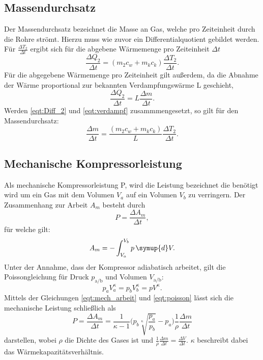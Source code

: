   \subsection{Massendurchsatz}
    Der Massendurchsatz bezeichnet die Masse an Gas, welche pro Zeiteinheit durch die Rohre strömt.
    Hierzu muss wie zuvor ein Differentialquotient gebildet werden. Für $\frac {\Delta T_2}{\Delta t}$ ergibt sich für die abgebene Wärmemenge pro Zeiteinheit $\Delta t$
    \begin{equation}
      \label{eqt:Diff_2}
      \frac {\Delta Q_2} {\Delta t} = (m_2 c_w + m_k c_k) \frac {\Delta T_2} {\Delta t}.
    \end{equation}
    Für die abgegebene Wärmemenge pro Zeiteinheit gilt außerdem, da die Abnahme der Wärme proportional zur bekannten Verdampfungswärme L geschieht, 
    \begin{equation}
      \label{eqt:verdampf}
      \frac {\Delta Q_2}{\Delta t} = L \frac {\Delta m} {\Delta t} .
    \end{equation}
    Werden \eqref {eqt:Diff_2} und \eqref {eqt:verdampf} zusammmengesetzt, so gilt für den Massendurchsatz:
    \begin{equation}
      \label{eqt:massendurchsatz}
      \frac {\Delta m} {\Delta t} = \frac {(m_2 c_w + m_k c_k)}{L} \frac {\Delta T_2} {\Delta t} .
    \end{equation}

  \subsection{Mechanische Kompressorleistung}
    Als mechanische Kompressorleistung P, wird die Leistung bezeichnet die benötigt wird um ein Gas mit dem Volumen $V_a$ auf ein Volumen $V_b$ zu verringern.
    Der Zusammenhang zur Arbeit $A_m$ besteht durch
    \begin{equation}
      P = \frac {\Delta A_m} {\Delta t},
    \end{equation}
    für welche gilt:
    \begin{equation}
      \label{eqt:mech_arbeit}
      A_m = - \int_{V_a}^{V_b} p \, \symup{d}V .
    \end{equation}
    Unter der Annahme, dass der Kompressor adiabatisch arbeitet, gilt die Poissongleichung für Druck $p_\text{a/b}$ und Volumen $V_\text{a/b}$:
    \begin{equation}
      \label{eqt:poisson}
      p_a V_a^\kappa = p_b V_b^\kappa = p V^\kappa .
    \end{equation}
    Mittels der Gleichungen \eqref {eqt:mech_arbeit} und \eqref {eqt:poisson} lässt sich die mechanische Leistung schließlich als
    \begin{equation}
      \label{eqt:mech_leistung}
      P = \frac {\Delta A_m} {\Delta t} = \frac {1}{\kappa -1} \bigg(p_b \sqrt[\kappa]{\frac{p_a}{p_b}} - p_a\bigg) \frac {1}{\rho} \frac {\Delta m} {\Delta t}  
    \end{equation}  
    darstellen, wobei $\rho$ die Dichte des Gases ist und $\frac {1}{\rho} \frac {\Delta m} {\Delta t} = \frac {\Delta V}{\Delta t}$.
    $\kappa$ beschreibt dabei das Wärmekapazitätsverhältnis.